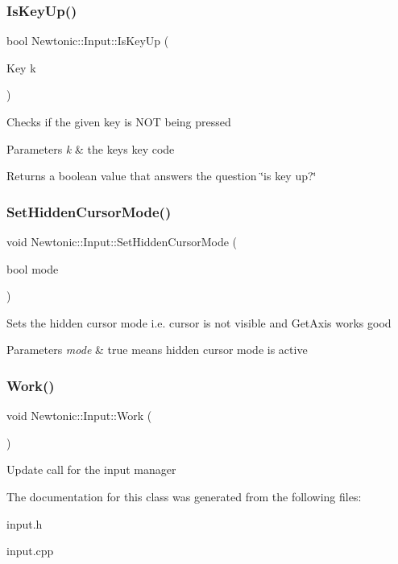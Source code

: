 \subsubsection{\texorpdfstring{IsKeyUp()}{IsKeyUp()}}
{\footnotesize\ttfamily bool Newtonic\+::\+Input\+::\+Is\+Key\+Up (\begin{DoxyParamCaption}\item[{Key}]{k }\end{DoxyParamCaption})\hspace{0.3cm}{\ttfamily [inline]}}

Checks if the given key is N\+OT being pressed 
\begin{DoxyParams}{Parameters}
{\em k} & the key\textquotesingle{}s key code \\
\hline
\end{DoxyParams}
\begin{DoxyReturn}{Returns}
a boolean value that answers the question \char`\"{}is key up?\char`\"{} 
\end{DoxyReturn}
\mbox{\label{classNewtonic_1_1Input_aa316306c91cb310db00e6163093cea5c}} 
\subsubsection{\texorpdfstring{SetHiddenCursorMode()}{SetHiddenCursorMode()}}
{\footnotesize\ttfamily void Newtonic\+::\+Input\+::\+Set\+Hidden\+Cursor\+Mode (\begin{DoxyParamCaption}\item[{bool}]{mode }\end{DoxyParamCaption})\hspace{0.3cm}{\ttfamily [inline]}}

Sets the hidden cursor mode i.\+e. cursor is not visible and Get\+Axis works good 
\begin{DoxyParams}{Parameters}
{\em mode} & true means hidden cursor mode is active \\
\hline
\end{DoxyParams}
\mbox{\label{classNewtonic_1_1Input_aeaf973089f2de350c1189446332c298d}} 
\subsubsection{\texorpdfstring{Work()}{Work()}}
{\footnotesize\ttfamily void Newtonic\+::\+Input\+::\+Work (\begin{DoxyParamCaption}{ }\end{DoxyParamCaption})}

Update call for the input manager 

The documentation for this class was generated from the following files\+:\begin{DoxyCompactItemize}
\item 
input.\+h\item 
input.\+cpp\end{DoxyCompactItemize}
